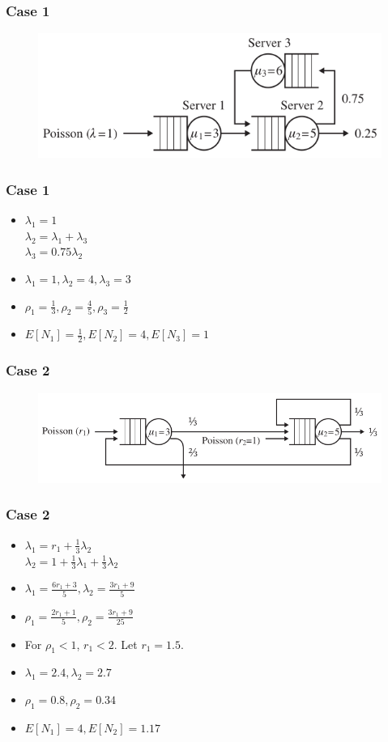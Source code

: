 \documentclass[10pt,notes]{beamer}
\begin{document}
\begin{frame}
    \frametitle{Case 1}
    \begin{figure}
        \includegraphics[width=0.75\linewidth]{images/case1.png}
    \end{figure}
\end{frame}

\begin{frame}
    \frametitle{Case 1}
    \begin{itemize}
        \item $\lambda_1 = 1$ \\
            $\lambda_2 = \lambda_1 + \lambda_3$ \\
            $\lambda_3 = 0.75\lambda_2$
        \item $\lambda_1 = 1, \lambda_2 = 4, \lambda_3 = 3$
        \item $\rho_1 = \frac{1}{3}, \rho_2 = \frac{4}{5}, \rho_3 = \frac{1}{2}$
        \item $E[N_1] = \frac{1}{2}, E[N_2] = 4, E[N_3] = 1$
    \end{itemize}
\end{frame}

\begin{frame}
    \frametitle{Case 2}
    \begin{figure}
        \includegraphics[width=0.7\linewidth]{images/case2.png}
    \end{figure}
\end{frame}

\begin{frame}
    \frametitle{Case 2}
    \begin{itemize}
        \item $\lambda_1 = r_1 + \frac{1}{3}\lambda_2$ \\
            $\lambda_2 = 1 + \frac{1}{3}\lambda_1 + \frac{1}{3}\lambda_2$ \\
        \item $\lambda_1 = \frac{6r_1 + 3}{5}, \lambda_2 = \frac{3r_1 + 9}{5}$
        \item $\rho_1 = \frac{2r_1 + 1}{5}, \rho_2 = \frac{3r_1 + 9}{25}$
        \item For $\rho_1 < 1$, $r_1 < 2$. Let $r_1 = 1.5$.
        \item $\lambda_1 = 2.4, \lambda_2 = 2.7$
        \item $\rho_1 = 0.8, \rho_2 = 0.34$
        \item $E[N_1] = 4, E[N_2] = 1.17$
    \end{itemize}
\end{frame}
\end{document}
